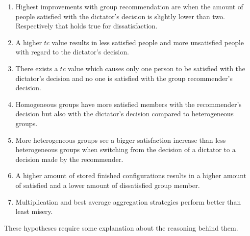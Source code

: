 \begin{enumerate}[font={\bfseries},label={H\arabic*}]
    \item \label{hyp:Evaluation:MaximumMinimum} Highest improvements with group recommendation are when the amount of people satisfied with the dictator's decision is slightly lower than two. Respectively that holds true for dissatisfaction. 
    \item \label{hyp:Evaluation:HigherTcLessSatisfied} A higher $tc$ value results in less satisfied people and more unsatisfied people with regard to the dictator's decision.
    \item \label{hyp:Evaluation:OnlyOneSatisfied} There exists a $tc$ value which causes only one person to be satisfied with the dictator's decision and no one is satisfied with the group recommender's decision.
    \item \label{hyp:Evaluation:HomogenousMoreSatisfied} Homogeneous groups have more satisfied members with the recommender's decision but also with the dictator's decision compared to heterogeneous groups.
    \item \label{hyp:Evaluation:HeterogenousBiggerSatisfactionIncrease} More heterogeneous groups see a bigger satisfaction increase than less heterogeneous groups when switching from the decision of a dictator to a decision made by the recommender.
    \item \label{hyp:Evaluation:StoreSizeBetterResults} A higher amount of stored finished configurations results in a higher amount of satisfied and a lower amount of dissatisfied group member.
    \item \label{hyp:Evaluation:AggregationStrategies} Multiplication and best average aggregation strategies perform better than least misery. %
\end{enumerate}

These hypotheses require some explanation about the reasoning behind them.

